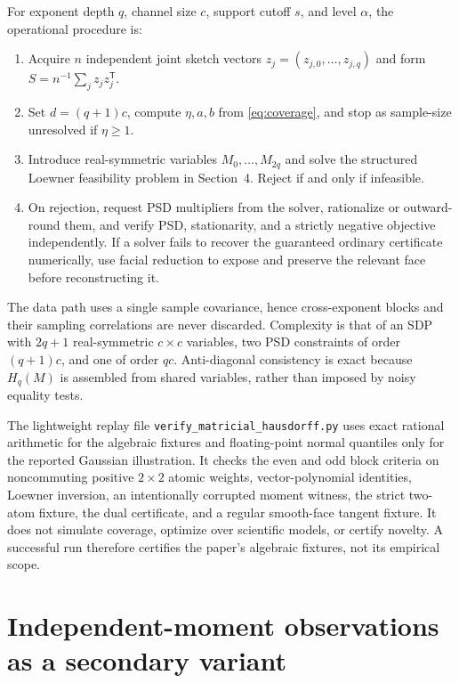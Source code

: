 \documentclass[11pt]{article}
\begin{document}
For exponent depth $q$, channel size $c$, support cutoff $s$, and level
$\alpha$, the operational procedure is:
\begin{enumerate}[label=\arabic*.]
 \item Acquire $n$ independent joint sketch vectors
 $z_j=(z_{j,0},\ldots,z_{j,q})$ and form
 $S=n^{-1}\sum_jz_jz_j^\mathsf T$.
 \item Set $d=(q+1)c$, compute $\eta,a,b$ from
 \cref{eq:coverage}, and stop as sample-size unresolved if $\eta\ge1$.
 \item Introduce real-symmetric variables $M_0,\ldots,M_{2q}$ and solve
 the structured Loewner feasibility problem in Section~4.  Reject if and
 only if infeasible.
 \item On rejection, request PSD multipliers from the solver, rationalize or
 outward-round them, and verify PSD, stationarity, and a strictly negative
 objective independently.  If a solver fails to recover the guaranteed
 ordinary certificate numerically, use facial reduction to expose and
 preserve the relevant face before reconstructing it.
\end{enumerate}

The data path uses a single sample covariance, hence cross-exponent blocks
and their sampling correlations are never discarded.  Complexity is that of
an SDP with $2q+1$ real-symmetric $c\times c$ variables, two PSD constraints of
order $(q+1)c$, and one of order $qc$.  Anti-diagonal consistency is exact
because $H_q(M)$ is assembled from shared variables, rather than imposed by
noisy equality tests.

The lightweight replay file
\texttt{verify\_matricial\_hausdorff.py} uses exact rational arithmetic for
the algebraic fixtures and floating-point normal quantiles only for the
reported Gaussian illustration.  It checks
the even and odd block criteria on noncommuting positive $2\times2$ atomic
weights, vector-polynomial identities, Loewner inversion, an intentionally
corrupted moment witness, the strict two-atom fixture, the dual certificate,
and a regular smooth-face tangent fixture.  It does not simulate coverage, optimize
over scientific models, or certify novelty.  A successful run therefore
certifies the paper's algebraic fixtures, not its empirical scope.

\section{Independent-moment observations as a secondary variant}
\end{document}
